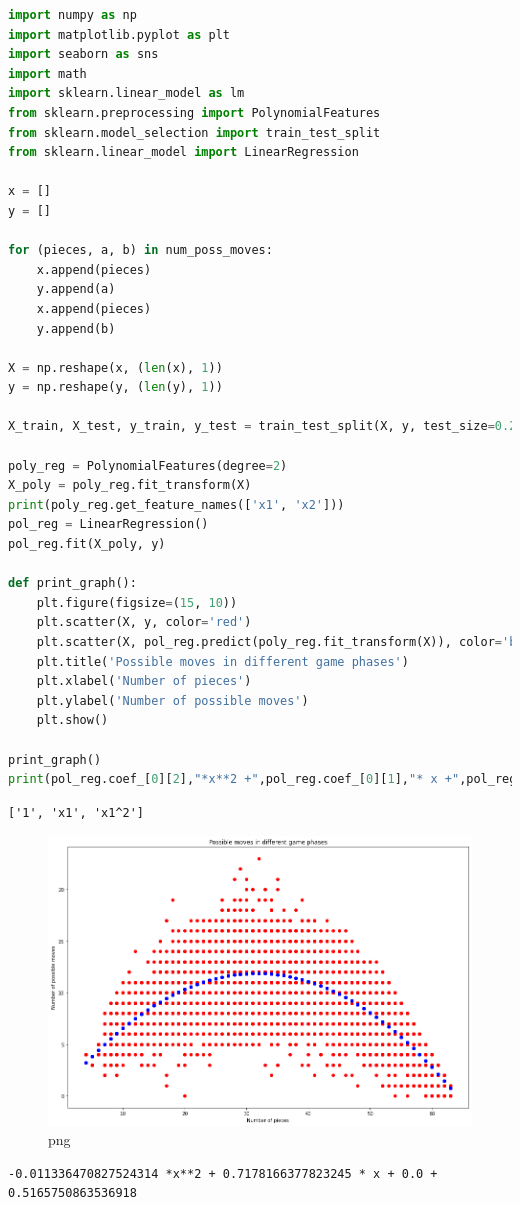 \begin{lstlisting}[language=Python]
import numpy as np
import matplotlib.pyplot as plt
import seaborn as sns
import math
import sklearn.linear_model as lm
from sklearn.preprocessing import PolynomialFeatures
from sklearn.model_selection import train_test_split
from sklearn.linear_model import LinearRegression

x = []
y = []

for (pieces, a, b) in num_poss_moves:
    x.append(pieces)
    y.append(a)
    x.append(pieces)
    y.append(b)

X = np.reshape(x, (len(x), 1))
y = np.reshape(y, (len(y), 1))

X_train, X_test, y_train, y_test = train_test_split(X, y, test_size=0.2, random_state=0)

poly_reg = PolynomialFeatures(degree=2)
X_poly = poly_reg.fit_transform(X)
print(poly_reg.get_feature_names(['x1', 'x2']))
pol_reg = LinearRegression()
pol_reg.fit(X_poly, y)

def print_graph():
    plt.figure(figsize=(15, 10))
    plt.scatter(X, y, color='red')
    plt.scatter(X, pol_reg.predict(poly_reg.fit_transform(X)), color='blue')
    plt.title('Possible moves in different game phases')
    plt.xlabel('Number of pieces')
    plt.ylabel('Number of possible moves')
    plt.show()

print_graph()
print(pol_reg.coef_[0][2],"*x**2 +",pol_reg.coef_[0][1],"* x +",pol_reg.coef_[0][0],"+",pol_reg.intercept_[0])
\end{lstlisting}

\begin{lstlisting}
['1', 'x1', 'x1^2']
\end{lstlisting}

\begin{figure}
\centering
\includegraphics{../content/implementation/othello_avg_num_moves_files/../content/implementation/othello_avg_num_moves_4_1.png}
\caption{png}
\end{figure}

\begin{lstlisting}
-0.011336470827524314 *x**2 + 0.7178166377823245 * x + 0.0 + 0.5165750863536918
\end{lstlisting}
